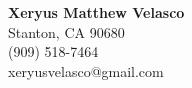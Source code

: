 \documentclass[12pt, letterpaper]{article}
\begin{document}
	\begin{center}
		\textbf{\large Xeryus Matthew Velasco}\\
		Stanton, CA 90680\\
		(909) 518-7464\\
		xeryusvelasco@gmail.com\\
	\end{center}
	
\end{document}
